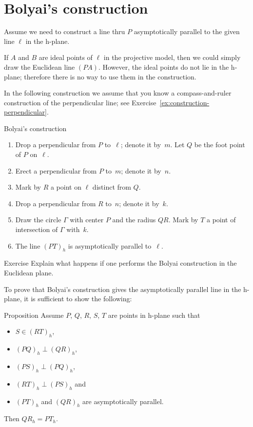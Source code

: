 \section{Bolyai's construction}

Assume we need to construct a line thru $P$ asymptotically parallel to the given line $\ell$ in the h-plane.

If $A$ and $B$ are ideal points of $\ell$ in the projective model, 
then we could simply draw the Euclidean line $(PA)$.
However, the ideal points do not lie in the h-plane; therefore there is no way to use them in the construction.

In the following construction we assume that you know a compass-and-ruler construction of the perpendicular line; see Exercise~\ref{ex:construction-perpendicular}.
\clearpage

\begin{thm}{Bolyai's construction}
\begin{enumerate}
\item Drop a perpendicular from $P$ to~$\ell$; denote it by~$m$.
Let $Q$ be the foot point of $P$ on~$\ell$.
\item Erect a perpendicular from $P$ to~$m$; denote it by~$n$.
\item Mark by $R$ a point on $\ell$ distinct from $Q$.
\item Drop a perpendicular from $R$ to~$n$; denote it by~$k$. 
\item Draw the circle $\Gamma$ with center $P$ and the radius $QR$. 
Mark by $T$ a point of intersection of $\Gamma$ with~$k$.
\item The line $(PT)_h$ is asymptotically parallel to~$\ell$.
\end{enumerate}
\end{thm}

\begin{thm}{Exercise}\label{ex:Boyai-in-Euclid}
Explain what happens if one performs the Bolyai construction in the Euclidean plane.
\end{thm}

To prove that Bolyai's construction gives the asymptotically parallel line in the h-plane,
it is sufficient to show the following:

\begin{thm}{Proposition}\label{prop:boyai}
Assume $P$, $Q$, $R$, $S$, $T$ are points in h-plane
such that 
\begin{itemize}
\item $S\in (RT)_h$,
\item $(PQ)_h\perp (QR)_h$,
\item $(PS)_h\perp(PQ)_h$,
\item $(RT)_h\perp (PS)_h$ and 
\item $(PT)_h$ and $(QR)_h$ are asymptotically parallel.
\end{itemize}
Then $QR_h=PT_h$.
\end{thm}


